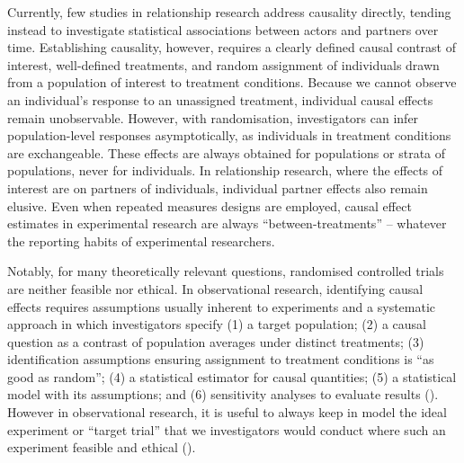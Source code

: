 \documentclass[
  singlecolumn]{article}
\begin{document}
Currently, few studies in relationship research address causality
directly, tending instead to investigate statistical associations
between actors and partners over time. Establishing causality, however,
requires a clearly defined causal contrast of interest, well-defined
treatments, and random assignment of individuals drawn from a population
of interest to treatment conditions. Because we cannot observe an
individual's response to an unassigned treatment, individual causal
effects remain unobservable. However, with randomisation, investigators
can infer population-level responses asymptotically, as individuals in
treatment conditions are exchangeable. These effects are always obtained
for populations or strata of populations, never for individuals. In
relationship research, where the effects of interest are on partners of
individuals, individual partner effects also remain elusive. Even when
repeated measures designs are employed, causal effect estimates in
experimental research are always ``between-treatments'' -- whatever the
reporting habits of experimental researchers.

Notably, for many theoretically relevant questions, randomised
controlled trials are neither feasible nor ethical. In observational
research, identifying causal effects requires assumptions usually
inherent to experiments and a systematic approach in which investigators
specify (1) a target population; (2) a causal question as a contrast of
population averages under distinct treatments; (3) identification
assumptions ensuring assignment to treatment conditions is ``as good as
random''; (4) a statistical estimator for causal quantities; (5) a
statistical model with its assumptions; and (6) sensitivity analyses to
evaluate results ().
However in observational research, it is useful to always keep in model
the ideal experiment or ``target trial'' that we investigators would
conduct where such an experiment feasible and ethical
().
\end{document}
